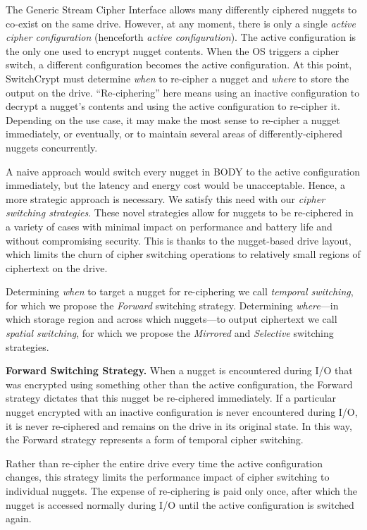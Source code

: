 The Generic Stream Cipher Interface allows many differently ciphered nuggets to
co-exist on the same drive. However, at any moment, there is only a single
\emph{active cipher configuration} (henceforth \emph{active configuration}). The
active configuration is the only one used to encrypt nugget contents. When the
OS triggers a cipher switch, a different configuration becomes the active
configuration. At this point, SwitchCrypt must determine \emph{when} to
re-cipher a nugget and \emph{where} to store the output on the drive.
``Re-ciphering'' here means using an inactive configuration to decrypt a
nugget's contents and using the active configuration to re-cipher it. Depending
on the use case, it may make the most sense to re-cipher a nugget immediately,
or eventually, or to maintain several areas of differently-ciphered nuggets
concurrently.

A naive approach would switch every nugget in BODY to the active configuration
immediately, but the latency and energy cost would be unacceptable. Hence, a
more strategic approach is necessary. We satisfy this need with our \emph{cipher
switching strategies}. These novel strategies allow for nuggets to be
re-ciphered in a variety of cases with minimal impact on performance and battery
life and without compromising security. This is thanks to the nugget-based drive
layout, which limits the churn of cipher switching operations to relatively
small regions of ciphertext on the drive.

Determining \emph{when} to target a nugget for re-ciphering we call
\emph{temporal switching}, for which we propose the \emph{Forward} switching
strategy. Determining \emph{where}---in which storage region and across which
nuggets---to output ciphertext we call \emph{spatial switching}, for which we
propose the \emph{Mirrored} and \emph{Selective} switching strategies.

\textbf{Forward Switching Strategy.} When a nugget is encountered during I/O
that was encrypted using something other than the active configuration, the
Forward strategy dictates that this nugget be re-ciphered immediately. If a
particular nugget encrypted with an inactive configuration is never encountered
during I/O, it is never re-ciphered and remains on the drive in its original
state. In this way, the Forward strategy represents a form of temporal cipher
switching.

Rather than re-cipher the entire drive every time the active configuration
changes, this strategy limits the performance impact of cipher switching to
individual nuggets. The expense of re-ciphering is paid only once, after which
the nugget is accessed normally during I/O until the active configuration is
switched again.

